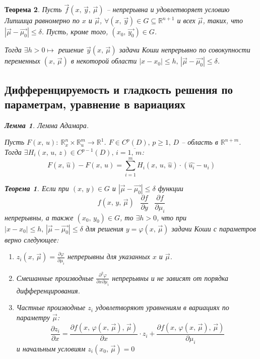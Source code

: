 \documentclass[a4paper,12pt]{article}
\renewcommand{\phi}{\ensuremath{\varphi}}
\renewcommand{\leq}{\ensuremath{\leqslant}}
\renewcommand{\geq}{\ensuremath{\geqslant}}
\theoremstyle{plain}
\newtheorem{theorem}{Теорема}[section]
\newtheorem{lemma}{Лемма}[section]
\theoremstyle{definition}
\theoremstyle{remark}
\begin{document}
\begin{theorem}
	Пусть $\vec{f}(x,\,\vec{y},\,\vec{\mu})$ -- непрерывна и удовлетворяет условию Липшица равномерно по $x$ и $\vec{\mu}$, $\forall (x,\,\vec{y}) \in G \subseteq \mathbb{R}^{n + 1}$ и всех $\vec{\mu}$, таких, что $|\vec{\mu} - \vec{\mu_0}| \leq \delta$. Пусть, кроме того, $(x_0,\, \vec{y_0}) \in G$.

	Тогда $\exists h > 0 \mapsto$ решение $\vec{y}(x,\,\vec{\mu})$ задачи Коши непрерывно по совокупности переменных $(x,\,\vec{\mu})$ в некоторой области $|x - x_0| \leq h,\, |\vec{\mu} - \vec{\mu_0}| \leq \delta$.

	\subsection{Дифференцируемость и гладкость решения по параметрам, уравнение в вариациях}

	\begin{lemma}
		Лемма Адамара.

		Пусть $F(x,\,u):\: \mathbb{R}^n_x \times \mathbb{R}^m_u \to \mathbb{R}^1$. $F \in C^p(D),\, p \geq 1,\, D$ -- область в $\mathbb{R}^{n + m}$. Тогда $\exists H_i(x,\,u,\,z) \in C^{p - 1}(D),\, i=\overline{1,\,m}$:
		\[F(x,\,\hat{u}) - F(x,\,u) = \sum_{i = 1}^m H_i(x,\,u,\,\hat{u})\cdot(\hat{u_i} - u_i)\]
	\end{lemma}

	\begin{theorem}
		Если при $(x,\,y) \in G$ и $|\vec{\mu} - \vec{\mu_0}| \leq \delta$ функции
		\[f(x,\,y,\,\vec{\mu})\;\;\; \frac{\partial f}{\partial y}\;\;\; \frac{\partial f}{\partial \mu_i}\]
		непрерывны, а также $(x_0,\,y_0) \in G$, то $\exists h > 0$, что при $|x - x_0| \leq h,\, |\vec{\mu} - \vec{\mu_0}| \leq \delta$ для решения $y = \phi(x,\, \vec{\mu})$ задачи Коши с параметров верно следующее:
		\begin{enumerate}
			\item $z_i(x,\,\vec{\mu}) = \frac{\partial \phi}{\partial \mu_i}$ непрерывны для указанных $x$ и $\vec{\mu}$.
			\item Смешанные производные $\frac{\partial^2 \phi}{\partial x \partial \mu_i}$ непрерывны и не зависят от порядка дифференцирования.
			\item Частные производные $z_i$ удовлетворяют уравнениям в вариациях по параметру $\vec{\mu}$:
			      \[\frac{\partial z_i}{\partial x} = \frac{\partial f(x,\, \phi(x,\,\vec{\mu}),\,\vec{\mu})}{\partial x}\cdot z_i + \frac{\partial f(x,\, \phi(x,\,\vec{\mu}),\,\vec{\mu})}{\partial \mu_i}\]
			      и начальным условиям $z_i(x_0,\,\vec{\mu}) = 0$
		\end{enumerate}
	\end{theorem}


\end{theorem}
\end{document}
